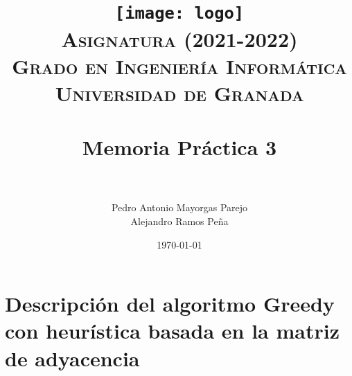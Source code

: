 

\graphicspath{ {img/} }

\title{
\normalfont \normalsize
\texttt{[image: logo]}\\
\textsc{\textbf{Asignatura (2021-2022)} \\ Grado en Ingeniería Informática \\ Universidad de Granada} \\ [25pt] %
\horrule{0.5pt} \\[0.4cm] %
\huge Memoria Práctica 3 \\ %
\horrule{2pt} \\[0.5cm] %
}


\author{Pedro Antonio Mayorgas Parejo  \\  Alejandro Ramos Peña} %

\date{\normalsize\today} %




\maketitle %

\newpage %

\tableofcontents %

\newpage


\section{Descripción del algoritmo Greedy con heurística basada en la matriz de adyacencia}

